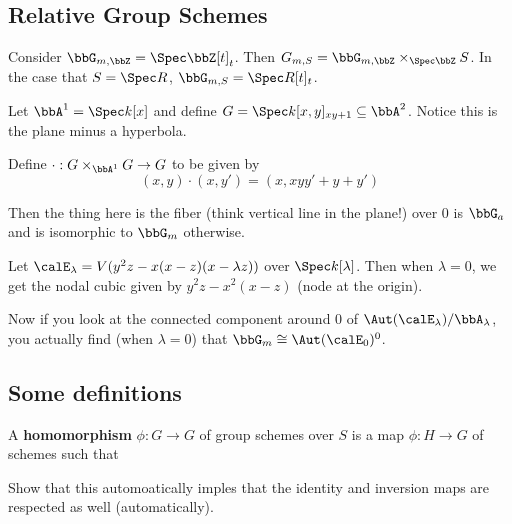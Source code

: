 \documentclass[12pt]{article}
\begin{document}
\subsection{Relative Group Schemes}
\begin{ex}
	Consider $\bbG_{m,\bbZ}=\Spec \bbZ[t]_t$. Then $G_{m,S}=\bbG_{m,\bbZ}\times_{\Spec \bbZ}S$. 
	In the case that $S=\Spec R$, $\bbG_{m,S}=\Spec R[t]_t$.
\end{ex}

\begin{ex}
	Let $\bbA^1=\Spec k[x]$ and define $G=\Spec k[x,y]_{xy+1}\subseteq\bbA^2$. Notice this is the plane minus a hyperbola.

	Define $\cdot:G\times_{\bbA^1}G\to G$ to be given by 
	\[(x,y)\cdot(x,y')=(x,xyy'+y+y')\]

	Then the thing here is the fiber (think vertical line in the plane!) over 0 is $\bbG_a$ and is isomorphic to $\bbG_m$ otherwise.
\end{ex}

\begin{ex}
	Let $\calE_\lambda=V(y^2z-x(x-z)(x-\lambda z))$ over $\Spec k[\lambda]$. Then when $\lambda=0$, we get the nodal cubic given by 
	$y^2z-x^2(x-z)$ (node at the origin). 

	Now if you look at the connected component around 0 of $\Aut(\calE_\lambda)/\bbA_\lambda$, you actually find (when $\lambda=0$) 
	that $\bbG_m\cong\Aut(\calE_0)^0$.
\end{ex}

\subsection{Some definitions}
\begin{defn}
	A \textbf{homomorphism} $\phi:G\to G$ of group schemes over $S$ is a map $\phi:H\to G$ of schemes such that 
	\begin{center}
	\end{center}
\end{defn}
\begin{prob}
	Show that this automoatically imples that the identity and inversion maps are respected as well (automatically).
\end{prob}
\end{document}
